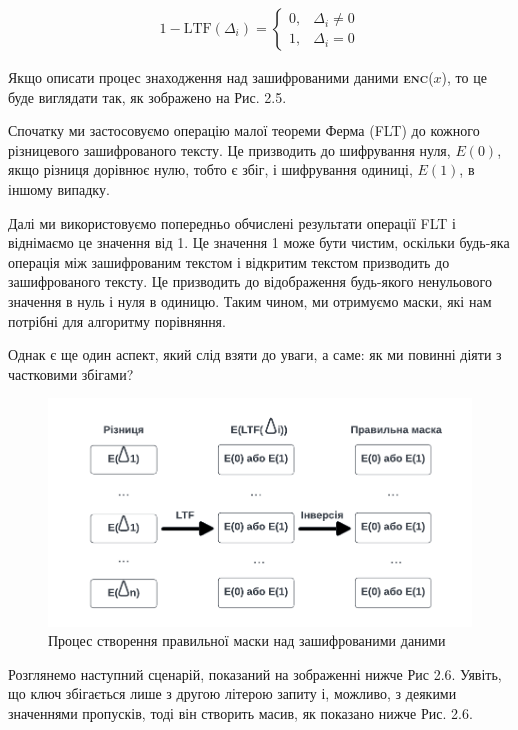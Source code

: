 \begin{itemize}
{\begin{align*}
1- \text{LTF}(\Delta_i) =
\begin{cases} 
    0, & \Delta_i \neq 0 \\
    1, & \Delta_i = 0
\end{cases}
\end{align*}

Якщо описати процес знаходження над зашифрованими даними \textsc{\textbf{enc}}(\(x\)), то це
буде виглядати так, як зображено на Рис. 2.5.

Спочатку ми застосовуємо операцію малої теореми Ферма (FLT) \cite{Fermat} до кожного різницевого
зашифрованого тексту. Це призводить до шифрування нуля, \(E(0)\), якщо різниця дорівнює нулю,
тобто є збіг, і шифрування одиниці, \(E(1)\), в іншому випадку.

Далі ми використовуємо попередньо обчислені результати операції FLT і віднімаємо це значення від
1. Це значення 1 може бути чистим, оскільки будь-яка операція між зашифрованим текстом і
відкритим текстом призводить до зашифрованого тексту. Це призводить до відображення будь-якого
ненульового значення в нуль і нуля в одиницю. Таким чином, ми отримуємо маски, які нам потрібні
для алгоритму порівняння. 

Однак є ще один аспект, який слід взяти до уваги, а саме: як ми повинні діяти з частковими збігами?

\begin{figure}[!ht]
    \centering
    \label{fig:mask-creation-flow}
    \includegraphics[scale=1.25]{static/mask-creation-flow.png}
    \caption{Процес створення правильної маски над зашифрованими даними}
\end{figure}
Розглянемо наступний сценарій, показаний на зображенні нижче Рис 2.6. Уявіть, що ключ збігається лише з
другою літерою запиту і, можливо, з деякими значеннями пропусків, тоді він створить масив, як
показано нижче Рис. 2.6.

}
\end{itemize}
